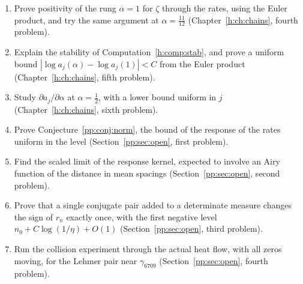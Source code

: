 \begin{enumerate}
\item Prove positivity of the rung $\alpha=1$ for $\zeta$ through the rates, using the Euler product, and try the same argument at $\alpha=\frac{11}{12}$ (Chapter~\ref{h:ch:chains}, fourth problem).
\item Explain the stability of Computation~\ref{h:comp:stab}, and prove a uniform bound $|\log a_j(\alpha)-\log a_j(1)|<C$ from the Euler product (Chapter~\ref{h:ch:chains}, fifth problem).
\item Study $\partial a_j/\partial\alpha$ at $\alpha=\frac12$, with a lower bound uniform in $j$ (Chapter~\ref{h:ch:chains}, sixth problem).
\item Prove Conjecture~\ref{pp:conj:norm}, the bound of the response of the rates uniform in the level (Section~\ref{pp:sec:open}, first problem).
\item Find the scaled limit of the response kernel, expected to involve an Airy function of the distance in mean spacings (Section~\ref{pp:sec:open}, second problem).
\item Prove that a single conjugate pair added to a determinate measure changes the sign of $r_n$ exactly once, with the first negative level $n_0+C\log(1/\eta)+O(1)$ (Section~\ref{pp:sec:open}, third problem).
\item Run the collision experiment through the actual heat flow, with all zeros moving, for the Lehmer pair near $\gamma_{6709}$ (Section~\ref{pp:sec:open}, fourth problem).
\end{enumerate}

